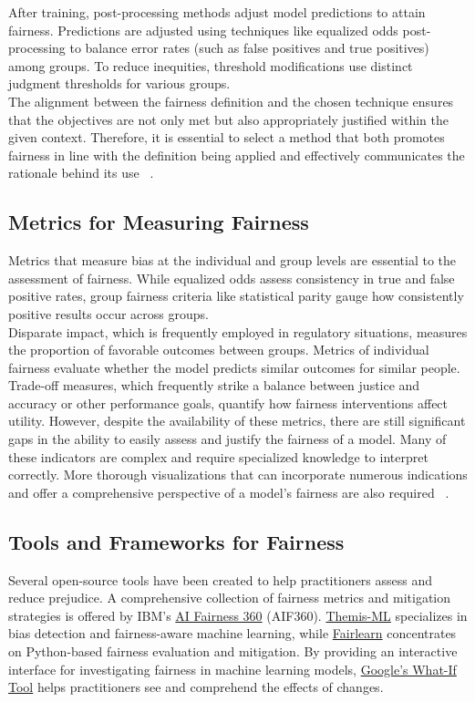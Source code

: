 \documentclass[runningheads]{llncs}
\begin{document}
After training, post-processing methods adjust model predictions to attain fairness. Predictions are adjusted using techniques like equalized odds post-processing to balance error rates (such as false positives and true positives) among groups. To reduce inequities, threshold modifications use distinct judgment thresholds for various groups.\\

The alignment between the fairness definition and the chosen technique ensures that the objectives are not only met but also appropriately justified within the given context. Therefore, it is essential to select a method that both promotes fairness in line with the definition being applied and effectively communicates the rationale behind its use ~\cite{hardt2016}.

\subsection{Metrics for Measuring Fairness}
Metrics that measure bias at the individual and group levels are essential to the assessment of fairness. While equalized odds assess consistency in true and false positive rates, group fairness criteria like statistical parity gauge how consistently positive results occur across groups. \\

Disparate impact, which is frequently employed in regulatory situations, measures the proportion of favorable outcomes between groups. Metrics of individual fairness evaluate whether the model predicts similar outcomes for similar people. Trade-off measures, which frequently strike a balance between justice and accuracy or other performance goals, quantify how fairness interventions affect utility. However, despite the availability of these metrics, there are still significant gaps in the ability to easily assess and justify the fairness of a model. Many of these indicators are complex and require specialized knowledge to interpret correctly. More thorough visualizations that can incorporate numerous indications and offer a comprehensive perspective of a model's fairness are also required ~\cite{bengio2024}.

\subsection{Tools and Frameworks for Fairness}
Several open-source tools have been created to help practitioners assess and reduce prejudice. A comprehensive collection of fairness metrics and mitigation strategies is offered by IBM's \href{https://aif360.res.ibm.com/}{AI Fairness 360} (AIF360). \href{https://themis-ml.readthedocs.io/en/latest/}{Themis-ML} specializes in bias detection and fairness-aware machine learning, while \href{https://fairlearn.org/}{Fairlearn} concentrates on Python-based fairness evaluation and mitigation. By providing an interactive interface for investigating fairness in machine learning models, \href{https://pair-code.github.io/what-if-tool/}{Google's What-If Tool} helps practitioners see and comprehend the effects of changes.
\end{document}
